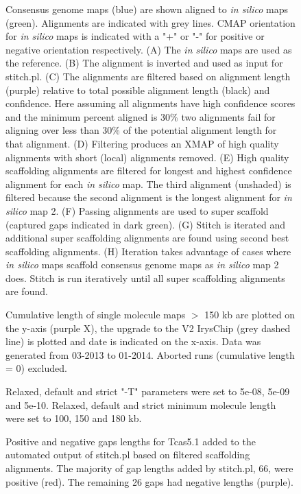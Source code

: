 \documentclass{bmcart}
\begin{document}
\begin{backmatter}
\begin{figure}[h!]
{      Consensus genome maps (blue) are shown aligned to \textit{in silico} maps (green). Alignments are indicated with grey lines. CMAP orientation for \textit{in silico} maps is indicated with a "+" or "-" for positive or negative orientation respectively. (A) The \textit{in silico} maps are used as the reference. (B) The alignment is inverted and used as input for stitch.pl. (C) The alignments are filtered based on alignment length (purple) relative to total possible alignment length (black) and confidence. Here assuming all alignments have high confidence scores and the minimum percent aligned is 30\% two alignments fail for aligning over less than 30\% of the potential alignment length for that alignment. (D) Filtering produces an XMAP of high quality alignments with short (local) alignments removed. (E) High quality scaffolding alignments are filtered for longest and highest confidence alignment for each \textit{in silico} map. The third alignment (unshaded) is filtered because the second alignment is the longest alignment for \textit{in silico} map 2. (F) Passing alignments are used to super scaffold (captured gaps indicated in dark green). (G) Stitch is iterated and additional super scaffolding alignments are found using second best scaffolding alignments. (H) Iteration takes advantage of cases where \textit{in silico} maps scaffold consensus genome maps as \textit{in silico} map 2 does. Stitch is run iteratively until all super scaffolding alignments are found.}
      \end{figure} 
\begin{figure}[h!]
	\caption{
 Cumulative length of single molecule maps $>$ 150 kb are plotted on the y-axis (purple X), the upgrade to the V2 IrysChip (grey dashed line) is plotted and date is indicated on the x-axis. Data was generated from 03-2013 to 01-2014. Aborted runs (cumulative length = 0) excluded. }
\end{figure}
\begin{figure}[h!]
	\caption{
 Relaxed, default and strict "-T" parameters were set to 5e-08, 5e-09 and 5e-10. Relaxed, default and strict minimum molecule length were set to 100, 150 and 180 kb.}
\end{figure}     
\begin{figure}[h!]
	\caption{
 Positive and negative gaps lengths for Tcas5.1 added to the automated output of stitch.pl based on filtered scaffolding alignments. The majority of gap lengths added by stitch.pl, 66, were positive (red). The remaining 26 gaps had negative lengths (purple).}

\end{figure}
\end{backmatter}
\end{document}
